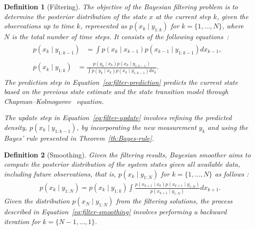 \documentclass[dissertation,math,vertlayout,pdfa,colorlinks,nologo]{aaltoseries}
\newtheorem{definition}{Definition}
\begin{document}
\begin{definition}[Filtering] \label{def:filtering}
    The objective of the Bayesian filtering problem is to determine the posterior distribution of the state $x$ at the current step $k$, given the observations up to time $k$, represented as $p(x_k \mid y_{1:k})$ for $k = \{1, \ldots, N\}$, where $N$ is the total number of time steps. It consists of the following equations~\citep[Theorem 6.5]{sarkka2023bayesian}:
    \begin{subequations}
    \begin{align}
        \begin{split} \label{eq:filter-prediction}
            p(x_k \mid y_{1:k-1}) & = \int p(x_k \mid x_{k-1}) p(x_{k-1} \mid y_{1:k-1}) dx_{k-1},
            \end{split}\\
            \begin{split} \label{eq:filter-update}
            p(x_k \mid y_{1:k}) &= \frac{p(y_k \mid x_k)p(x_k \mid y_{1:k-1})}{\int p(y_k \mid x_k)p(x_k \mid y_{1:k-1}) dx_k}.
        \end{split}
    \end{align}
    \end{subequations}
    The prediction step in Equation~\eqref{eq:filter-prediction} predicts the current state based on the previous state estimate and the state transition model through Chapman–Kolmogorov~\citep{[?]} equation.
    
    The update step in Equation~\eqref{eq:filter-update} involves refining the predicted density, $p(x_k \mid y_{1:k-1})$, by incorporating the new measurement $y_k$ and using the Bayes' rule presented in Theorem~\ref{th:Bayes-rule}.
\end{definition}
%
\begin{definition}[Smoothing] \label{def:smoothing}
    Given the filtering results, Bayesian smoother aims to compute the posterior distribution of the system states given all available data, including future observations, that is, $p(x_k \mid y_{1:N})$ for $k = \{1, \ldots, N\}$ as follows \citep[Theorem 12.1]{sarkka2023bayesian}:
    \begin{equation} \label{eq:filter-smoothing}
        \begin{split}
            &p(x_k \mid y_{1:N}) = p(x_k \mid y_{1:k}) \int \frac{p(x_{k+1} \mid x_k) p(x_{k+1} \mid y_{1:N})}{p(x_{k+1} \mid y_{1:N})} dx_{k+1}.
        \end{split}
    \end{equation}
    Given the distribution $p(x_N \mid y_{1:N})$ from the filtering solutions, the process described in Equation~\eqref{eq:filter-smoothing} involves performing a backward iteration for $k = \{N-1, \ldots, 1\}$.
\end{definition}
\end{document}
